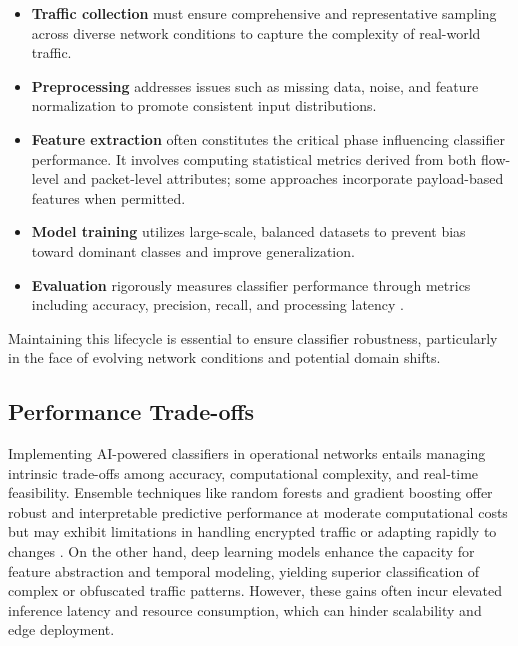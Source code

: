 \documentclass[sigconf]{acmart}
\begin{document}
\begin{itemize}
\item \textbf{Traffic collection} must ensure comprehensive and representative sampling across diverse network conditions to capture the complexity of real-world traffic.

\item \textbf{Preprocessing} addresses issues such as missing data, noise, and feature normalization to promote consistent input distributions.

\item \textbf{Feature extraction} often constitutes the critical phase influencing classifier performance. It involves computing statistical metrics derived from both flow-level and packet-level attributes; some approaches incorporate payload-based features when permitted.

\item \textbf{Model training} utilizes large-scale, balanced datasets to prevent bias toward dominant classes and improve generalization.

\item \textbf{Evaluation} rigorously measures classifier performance through metrics including accuracy, precision, recall, and processing latency \cite{ref51}.
\end{itemize}

Maintaining this lifecycle is essential to ensure classifier robustness, particularly in the face of evolving network conditions and potential domain shifts.

\subsection{Performance Trade-offs}

Implementing AI-powered classifiers in operational networks entails managing intrinsic trade-offs among accuracy, computational complexity, and real-time feasibility. Ensemble techniques like random forests and gradient boosting offer robust and interpretable predictive performance at moderate computational costs but may exhibit limitations in handling encrypted traffic or adapting rapidly to changes \cite{ref51}. On the other hand, deep learning models enhance the capacity for feature abstraction and temporal modeling, yielding superior classification of complex or obfuscated traffic patterns. However, these gains often incur elevated inference latency and resource consumption, which can hinder scalability and edge deployment.
\end{document}
